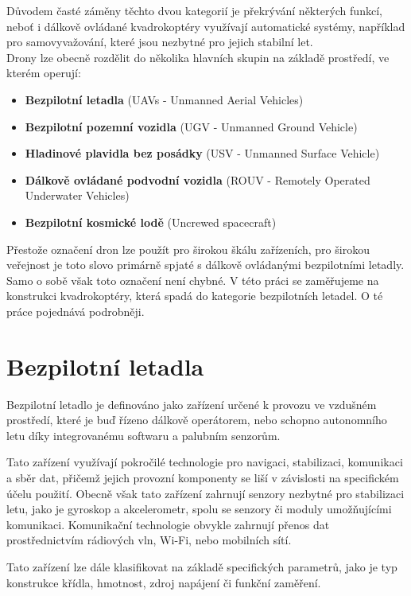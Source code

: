 \documentclass[12pt]{report}
\begin{document}
Důvodem časté záměny těchto dvou kategorií je překrývání některých funkcí, neboť i dálkově ovládané kvadrokoptéry využívají automatické systémy, například pro samovyvažování, které jsou nezbytné pro jejich stabilní let.\\

Drony lze obecně rozdělit do několika hlavních skupin na základě prostředí, ve kterém operují:
\begin{itemize}
	\item \textbf{Bezpilotní letadla} (UAVs - Unmanned Aerial Vehicles)
	\item \textbf{Bezpilotní pozemní vozidla} (UGV - Unmanned Ground Vehicle)
	\item \textbf{Hladinové plavidla bez posádky} (USV - Unmanned Surface Vehicle)
	\item \textbf{Dálkově ovládané podvodní vozidla} (ROUV - Remotely Operated Underwater Vehicles)
	\item \textbf{Bezpilotní kosmické lodě} (Uncrewed spacecraft)
\end{itemize}

Přestože označení dron lze použít pro širokou škálu zařízeních, pro širokou veřejnost je toto slovo primárně spjaté s dálkově ovládanými bezpilotními letadly. Samo o sobě však toto označení není chybné. V této práci se zaměřujeme na konstrukci kvadrokoptéry, která spadá do kategorie bezpilotních letadel. O té práce pojednává podrobněji. \cite{mainbook}

\section{Bezpilotní letadla}

Bezpilotní letadlo je definováno jako zařízení určené k provozu ve vzdušném prostředí, které je buď řízeno dálkově operátorem, nebo schopno autonomního letu díky integrovanému softwaru a palubním senzorům. 

Tato zařízení využívají pokročilé technologie pro navigaci, stabilizaci, komunikaci a sběr dat, přičemž jejich provozní komponenty se liší v závislosti na specifickém účelu použití. Obecně však tato zařízení zahrnují senzory nezbytné pro stabilizaci letu, jako je gyroskop a akcelerometr, spolu se senzory či moduly umožňujícími komunikaci. Komunikační technologie obvykle zahrnují přenos dat prostřednictvím rádiových vln, Wi-Fi, nebo mobilních sítí.

Tato zařízení lze dále klasifikovat na základě specifických parametrů, jako je typ konstrukce křídla, hmotnost, zdroj napájení či funkční zaměření.\\
\end{document}

